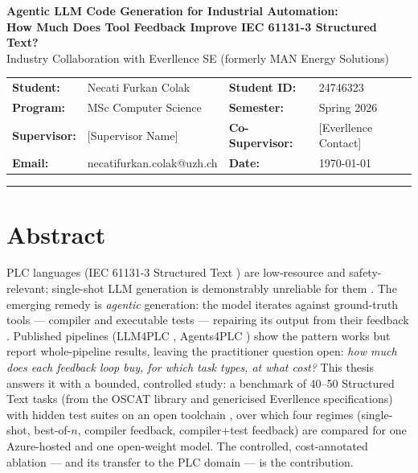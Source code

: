 \documentclass[10pt,a4paper]{article}
\begin{document}
\begin{center}
    {\large \textbf{Agentic LLM Code Generation for Industrial Automation:\\[0.1em]How Much Does Tool Feedback Improve IEC 61131-3 Structured Text?}}\\[0.2em]
    {\small Industry Collaboration with Everllence SE (formerly MAN Energy Solutions)}
\end{center}

\vspace{0.2em}

\noindent
{\small
\begin{tabularx}{\textwidth}{>{\bfseries}l X >{\bfseries}l X}
Student: & Necati Furkan Colak & Student ID: & 24746323 \\
Program: & MSc Computer Science & Semester: & Spring 2026 \\
Supervisor: & [Supervisor Name] & Co-Supervisor: & [Everllence Contact] \\
Email: & necatifurkan.colak@uzh.ch & Date: & \today \\
\end{tabularx}}

\vspace{0.3em}
\hrule
\vspace{0.3em}

\section{Abstract}

PLC languages (IEC 61131-3 Structured Text \cite{iec61131}) are low-resource and safety-relevant; single-shot LLM generation is demonstrably unreliable for them \cite{koziolek2023chatgpt, fakih2024llm4plc}. The emerging remedy is \emph{agentic} generation: the model iterates against ground-truth tools --- compiler and executable tests --- repairing its output from their feedback \cite{chen2023selfdebug, shinn2023reflexion}. Published pipelines (LLM4PLC \cite{fakih2024llm4plc}, Agents4PLC \cite{liu2024agents4plc}) show the pattern works but report whole-pipeline results, leaving the practitioner question open: \emph{how much does each feedback loop buy, for which task types, at what cost?} This thesis answers it with a bounded, controlled study: a benchmark of 40--50 Structured Text tasks (from the OSCAT library \cite{oscat} and genericised Everllence specifications) with hidden test suites on an open toolchain \cite{tisserant2007beremiz}, over which four regimes (single-shot, best-of-$n$, compiler feedback, compiler+test feedback) are compared for one Azure-hosted and one open-weight model. The controlled, cost-annotated ablation --- and its transfer to the PLC domain --- is the contribution.
\end{document}
